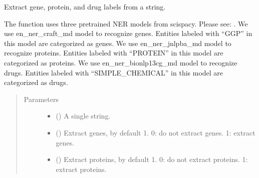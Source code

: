 \documentclass[letterpaper,10pt,english]{sphinxmanual}
\begin{document}

\begin{fulllineitems}
\label{\detokenize{biomarker_extraction:biomarker_extraction.gene_protein_chemical}}
\sphinxAtStartPar
Extract gene, protein, and drug labels from a string.

\sphinxAtStartPar
The function uses three pre\sphinxhyphen{}trained NER models from scispacy. Please see: . We use en\_ner\_craft\_md model to recognize genes. Entities labeled with “GGP” in this model are categorized as genes. We use en\_ner\_jnlpba\_md model to recognize proteins. Entities labeled with “PROTEIN” in this model are categorized as proteins. We use en\_ner\_bionlp13cg\_md model to recognize drugs. Entities labeled with “SIMPLE\_CHEMICAL” in this model are categorized as drugs.
\begin{quote}\begin{description}
\item[{Parameters}] \leavevmode\begin{itemize}
\item {} 
\sphinxAtStartPar
{} () \textendash{} A single string.

\item {} 
\sphinxAtStartPar
{} (\sphinxstyleliteralemphasis{\sphinxupquote{, }}) \textendash{} Extract genes, by default 1.
0: do not extract genes. 1: extract genes.

\item {} 
\sphinxAtStartPar
{} (\sphinxstyleliteralemphasis{\sphinxupquote{, }}) \textendash{} Extract proteins, by default 1.
0: do not extract proteins. 1: extract proteins.


\end{itemize}
\end{description}
\end{quote}
\end{fulllineitems}
\end{document}
